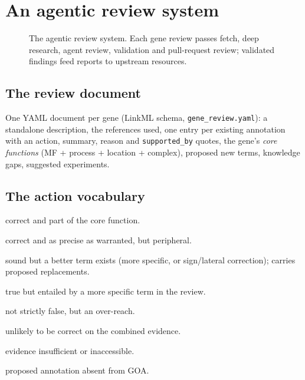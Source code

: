 \section{An agentic review system}\label{sec:system}

\begin{figure}[t]\centering
\resizebox{\linewidth}{!}{}
\caption{The agentic review system. Each gene review passes fetch, deep research, agent review,
validation and pull-request review; validated findings feed reports to upstream resources.}
\label{fig:system}
\end{figure}

\subsection{The review document}
One YAML document per gene (LinkML schema, \texttt{gene\_review.yaml}): a standalone
description, the references used, one entry per existing annotation with an action, summary,
reason and \texttt{supported\_by} quotes, the gene's \emph{core functions} (MF + process +
location + complex), proposed new terms, knowledge gaps, suggested experiments.

\subsection{The action vocabulary}
\begin{description}[nosep,font=\normalfont\scshape]
  \item[accept] correct and part of the core function.
  \item[keep\_as\_non\_core] correct and as precise as warranted, but peripheral.
  \item[modify] sound but a better term exists (more specific, or sign/lateral correction);
        carries proposed replacements.
  \item[too\_general] true but entailed by a more specific term in the review.
  \item[mark\_as\_over\_annotated] not strictly false, but an over-reach.
  \item[remove] unlikely to be correct on the combined evidence.
  \item[undecided] evidence insufficient or inaccessible.
  \item[new] proposed annotation absent from GOA.
\end{description}

